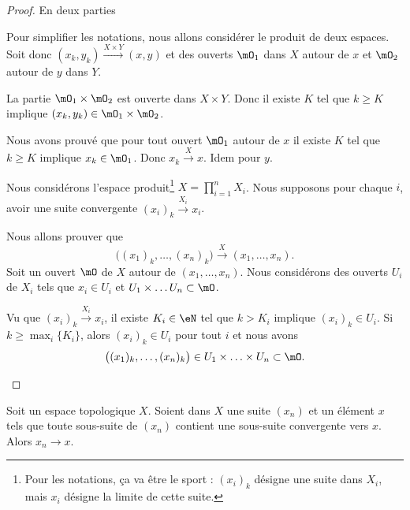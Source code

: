 \begin{proof}
	En deux parties
	\begin{subproof}
		Pour simplifier les notations, nous allons considérer le produit de deux espaces. Soit donc \( (x_k,y_k)\stackrel{X\times Y}{\longrightarrow}(x,y)\) et des ouverts \( \mO_1\) dans \( X\) autour de \( x\) et \( \mO_2\) autour de \( y\) dans \( Y\).

		La partie \( \mO_1\times \mO_2\) est ouverte dans \( X\times Y\). Donc il existe \( K\) tel que \( k\geq K\) implique \( (x_k,y_k)\in \mO_1\times \mO_2\).

		Nous avons prouvé que pour tout ouvert \( \mO_1\) autour de \( x\) il existe \( K\) tel que \( k\geq K\) implique \( x_k\in \mO_1\). Donc \( x_k\stackrel{X}{\longrightarrow}x\). Idem pour \( y\).

		Nous considérons l'espace produit\footnote{Pour les notations, ça va être le sport : \( (x_i)_k\) désigne une suite dans \( X_i\), mais \( x_i\) désigne la limite de cette suite.} \( X=\prod_{i=1}^nX_i\). Nous supposons pour chaque \( i\), avoir une suite convergente \( (x_i)_k\stackrel{X_i}{\longrightarrow}x_i\).

		Nous allons prouver que
		\begin{equation}
			\big( (x_1)_k,\ldots, (x_n)_k \big)\stackrel{X}{\longrightarrow}(x_1,\ldots, x_n).
		\end{equation}
		Soit un ouvert \( \mO\) de \( X\) autour de \( (x_1,\ldots, x_n)\). Nous considérons des ouverts \( U_i\) de \( X_i\) tels que \( x_i\in U_i\) et \( U_1\times\ldots U_n\subset\mO\).

		Vu que \( (x_i)_k\stackrel{X_i}{\longrightarrow}x_i\), il existe \( K_i\in \eN\) tel que \( k>K_i\) implique \( (x_i)_k\in U_i\). Si \( k\geq \max_i\{ K_i \}\), alors \( (x_i)_k\in U_i\) pour tout \( i\) et nous avons
		\begin{equation}
			\big( (x_1)_k,\ldots,(x_n)_k \big)\in U_1\times\ldots\times U_n\subset \mO.
		\end{equation}
	\end{subproof}
\end{proof}

\begin{lemma}        \label{LEMooSJKMooKSiEGq}
	Soit un espace topologique \( X\). Soient dans \( X\) une suite \( (x_n)\) et un élément \( x\) tels que toute sous-suite de \( (x_n)\) contient une sous-suite convergente vers \( x\). Alors \( x_n\to x\).
\end{lemma}

